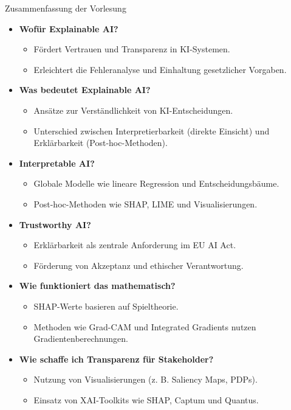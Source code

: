 \documentclass[aspectratio=1610, xcolor=dvipsnames, 9pt]{beamer}
\begin{document}
\begin{frame}{Zusammenfassung der Vorlesung}
  \begin{itemize}
    \item \textbf{Wofür Explainable AI?}
    \begin{itemize}
      \item Fördert Vertrauen und Transparenz in KI-Systemen.
      \item Erleichtert die Fehleranalyse und Einhaltung gesetzlicher Vorgaben.
    \end{itemize}
    \item \textbf{Was bedeutet Explainable AI?}
    \begin{itemize}
      \item Ansätze zur Verständlichkeit von KI-Entscheidungen.
      \item Unterschied zwischen Interpretierbarkeit (direkte Einsicht) und Erklärbarkeit (Post-hoc-Methoden).
    \end{itemize}
    \item \textbf{Interpretable AI?}
    \begin{itemize}
      \item Globale Modelle wie lineare Regression und Entscheidungsbäume.
      \item Post-hoc-Methoden wie SHAP, LIME und Visualisierungen.
    \end{itemize}
    \item \textbf{Trustworthy AI?}
    \begin{itemize}
      \item Erklärbarkeit als zentrale Anforderung im EU AI Act.
      \item Förderung von Akzeptanz und ethischer Verantwortung.
    \end{itemize}
    \item \textbf{Wie funktioniert das mathematisch?}
    \begin{itemize}
      \item SHAP-Werte basieren auf Spieltheorie.
      \item Methoden wie Grad-CAM und Integrated Gradients nutzen Gradientenberechnungen.
    \end{itemize}
    \item \textbf{Wie schaffe ich Transparenz für Stakeholder?}
    \begin{itemize}
      \item Nutzung von Visualisierungen (z. B. Saliency Maps, PDPs).
      \item Einsatz von XAI-Toolkits wie SHAP, Captum und Quantus.
    \end{itemize}
  \end{itemize}
\end{frame}
\end{document}
